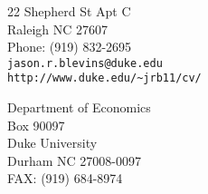 \documentclass[margin,line,11pt,draft]{res}
\begin{document}


\begin{resume}

\hspace{-0cm}
\begin{minipage}{1.25\linewidth}
  \begin{minipage}{0.49\linewidth}
    22 Shepherd St Apt C \\
    Raleigh NC 27607 \\
    Phone: (919) 832-2695 \\
    {\tt jason.r.blevins@duke.edu} \\
    {\tt \verb+http://www.duke.edu/~jrb11/cv/+} \\
  \end{minipage}
  \hspace{\fill}
  \begin{minipage}{0.49\linewidth}
    Department of Economics\\
    Box 90097 \\
    Duke University \\
    Durham NC 27008-0097 \\
    FAX: (919) 684-8974  \\
  \end{minipage}
\end{minipage}

\end{resume}
\end{document}
